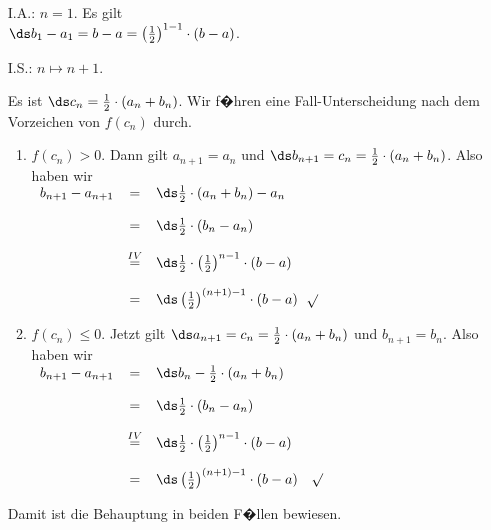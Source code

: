 \begin{enumerate}
\item[I.A.:] $n = 1$. Es gilt 
      \\[0.2cm]
      \hspace*{1.3cm}
      $\ds b_1 - a_1 = b - a = \left(\frac{1}{2}\right)^{1-1} \cdot (b-a)$.
\item[I.S.:] $n \mapsto n+1$.  

      Es ist $\ds c_n = \frac{1}{2} \cdot (a_n + b_n)$.   Wir f�hren eine 
      Fall-Unterscheidung nach dem Vorzeichen von $f(c_n)$ durch.
      \begin{enumerate}
      \item $f(c_n) > 0$.  Dann gilt $a_{n+1} = a_n$ und 
            $\ds b_{n+1} = c_n = \frac{1}{2} \cdot(a_n + b_n)$.
            Also haben wir      
            \\[0.2cm]
            \hspace*{1.3cm}
            $
            \begin{array}[b]{lcl}
              b_{n+1} - a_{n+1} & = & \ds\frac{1}{2}\cdot(a_n + b_n) - a_n \\[0.4cm]
                               & = & \ds\frac{1}{2}\cdot(b_n - a_n)       \\[0.4cm]  
                  & \stackrel{IV}{=} & \ds\frac{1}{2}\cdot\left(\frac{1}{2}\right)^{n-1}\cdot(b - a) \\[0.4cm]  
                                & = & \ds\left(\frac{1}{2}\right)^{(n+1) - 1}\cdot(b - a) 
            \end{array}
            $$\surd$
      \item $f(c_n) \leq 0$.  Jetzt gilt $\ds a_{n+1} = c_n = \frac{1}{2}\cdot(a_n + b_n)$ und 
            $b_{n+1} = b_n$.
            Also haben wir      
            \\[0.2cm]
            \hspace*{1.3cm}
            $
            \begin{array}[b]{lcl}
              b_{n+1} - a_{n+1} & = & \ds b_n - \frac{1}{2}\cdot(a_n + b_n) \\[0.4cm]
                                & = & \ds\frac{1}{2}\cdot(b_n - a_n)       \\[0.4cm]  
                  & \stackrel{IV}{=} & \ds\frac{1}{2}\cdot\left(\frac{1}{2}\right)^{n-1}\cdot(b - a) \\[0.4cm]  
                                & = & \ds\left(\frac{1}{2}\right)^{(n+1)-1}\cdot(b - a) 
            \end{array}
            $ $\surd$
      \end{enumerate}
      Damit ist die Behauptung in beiden F�llen bewiesen.
\end{enumerate}
